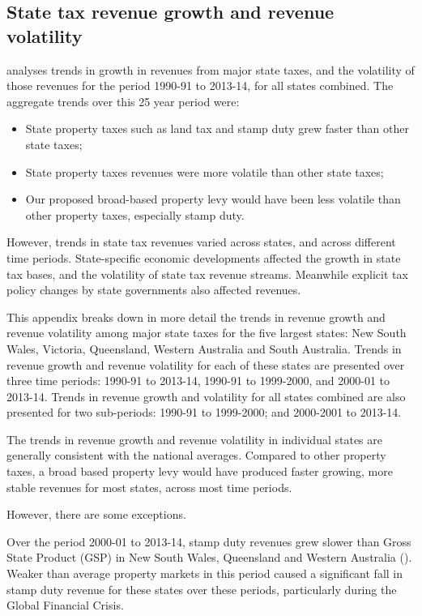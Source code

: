 \documentclass[twoside,english]{grattanBudgetRepairb5portrait}
\begin{document}
\begin{subappendices}
\chapter{State tax revenue growth and revenue volatility\label{appendix:PROP}}
 analyses trends in growth in revenues from major state taxes, and the volatility of those revenues for the period 1990-91 to 2013-14, for all states combined. The aggregate trends over this 25 year period were:

\begin{itemize}
\item	State property taxes such as land tax and stamp duty grew faster than other state taxes;
\item	State property taxes revenues were more volatile than other state taxes;
\item	Our proposed broad-based property levy would have been less volatile than other property taxes, especially stamp duty.
\end{itemize}

However, trends in state tax revenues varied across states, and across different time periods. State-specific economic developments affected the growth in state tax bases, and the volatility of state tax revenue streams. Meanwhile explicit tax policy changes by state governments also affected revenues.

This appendix breaks down in more detail the trends in revenue growth and revenue volatility among major state taxes for the five largest states: New South Wales, Victoria, Queensland, Western Australia and South Australia. Trends in revenue growth and revenue volatility for each of these states are presented over three time periods: 1990-91 to 2013-14, 1990-91 to 1999-2000, and 2000-01 to 2013-14. Trends in revenue growth and volatility for all states combined are also presented for two sub-periods: 1990-91 to 1999-2000; and 2000-2001 to 2013-14.

The trends in revenue growth and revenue volatility in individual states are generally consistent with the national averages. Compared to other property taxes, a broad based property levy would have produced faster growing, more stable revenues for most states, across most time periods.

However, there are some exceptions.  

Over the period 2000-01 to 2013-14, stamp duty revenues grew slower than Gross State Product (GSP) in New South Wales, Queensland and Western Australia (). Weaker than average property markets in this period caused a significant fall in stamp duty revenue for these states over these periods, particularly during the Global Financial Crisis. 


\end{subappendices}
\end{document}
